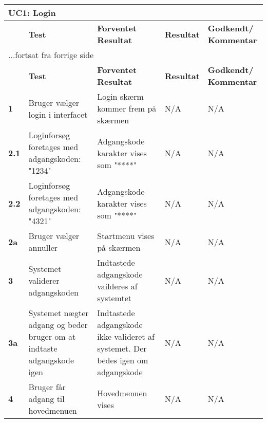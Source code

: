 
\begin{center}
\begin{longtable}{|p{}|p{}|p{}|p{}|p{}|} %
\hline
\multicolumn{5}{|l|}{\textbf{UC1: Login}} \\ \hline
\multicolumn{1}{|c|}{} &
\textbf{Test} &
\textbf{Forventet \newline Resultat} &
\textbf{Resultat} &
\textbf{Godkendt/ \newline Kommentar} \\ \hline 
\endfirsthead

\multicolumn{5}{l}{...fortsat fra forrige side} \\ \hline 
\multicolumn{1}{c|}{} &
\textbf{Test} &
\textbf{Forventet \newline Resultat} &
\textbf{Resultat} &
\textbf{Godkendt/ \newline Kommentar} \\ \hline 
\endhead


\textbf{1}		
&Bruger vælger login i interfacet
&Login skærm kommer frem på skærmen 	
&N/A 	
&N/A \\\hline
\textbf{2.1}		
&Loginforsøg foretages med adgangskoden: "1234"	
&Adgangskode karakter vises som "****" 	
&N/A 	
&N/A \\\hline
\textbf{2.2}		
&Loginforsøg foretages med adgangskoden: "4321"	
&Adgangskode karakter vises som "****" 	
&N/A 	
&N/A \\\hline
\textbf{2a}		
&Bruger vælger annuller	
&Startmenu vises på skærmen 	
&N/A 	
&N/A \\\hline

\textbf{3}		
&Systemet validerer adgangskoden		
&Indtastede adgangskode vailderes af systemtet 	
&N/A 	
&N/A \\\hline
\textbf{3a}		
&Systemet nægter adgang og beder bruger om at indtaste adgangskode igen	
&Indtastede adgangskode ikke valideret af systemet. Der bedes igen om adgangskode	
&N/A 	
&N/A \\\hline
\textbf{4}		
&Bruger får adgang til hovedmenuen		
&Hovedmenuen vises
&N/A 	
&N/A  \\\hline
	\end{longtable}
	\label{ATUC1} 
\end{center}